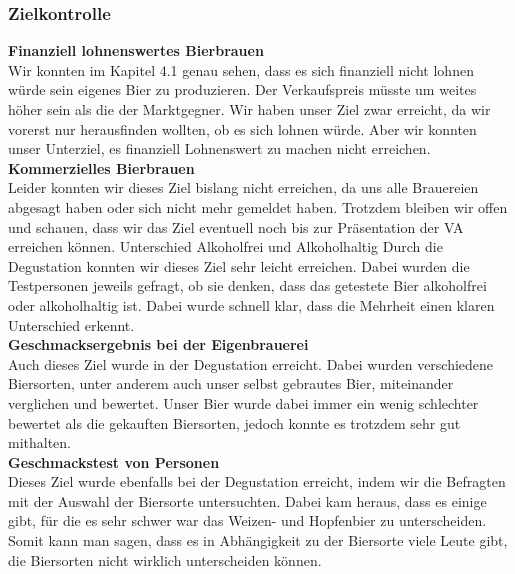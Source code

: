 \subsubsection{Zielkontrolle}
\textbf{Finanziell lohnenswertes Bierbrauen}\\
Wir konnten im Kapitel 4.1 genau sehen, dass es sich finanziell nicht lohnen würde sein eigenes Bier zu produzieren. Der Verkaufspreis müsste um weites höher sein als die der Marktgegner. Wir haben unser Ziel zwar erreicht, da wir vorerst nur herausfinden wollten, ob es sich lohnen würde. Aber wir konnten unser Unterziel, es finanziell Lohnenswert zu machen nicht erreichen.
\\
\textbf{Kommerzielles Bierbrauen}\\
Leider konnten wir dieses Ziel bislang nicht erreichen, da uns alle Brauereien abgesagt haben oder sich nicht mehr gemeldet haben. Trotzdem bleiben wir offen und schauen, dass wir das Ziel eventuell noch bis zur Präsentation der VA erreichen können.
Unterschied Alkoholfrei und Alkoholhaltig
Durch die Degustation konnten wir dieses Ziel sehr leicht erreichen. Dabei wurden die Testpersonen jeweils gefragt, ob sie denken, dass das getestete Bier alkoholfrei oder alkoholhaltig ist. Dabei wurde schnell klar, dass die Mehrheit einen klaren Unterschied erkennt.
\\\newpage
\textbf{Geschmacksergebnis bei der Eigenbrauerei}\\
Auch dieses Ziel wurde in der Degustation erreicht. Dabei wurden verschiedene Biersorten, unter anderem auch unser selbst gebrautes Bier, miteinander verglichen und bewertet. Unser Bier wurde dabei immer ein wenig schlechter bewertet als die gekauften Biersorten, jedoch konnte es trotzdem sehr gut mithalten.
\\
\textbf{Geschmackstest von Personen}\\
Dieses Ziel wurde ebenfalls bei der Degustation erreicht, indem wir die Befragten mit der Auswahl der Biersorte untersuchten. Dabei kam heraus, dass es einige gibt, für die es sehr schwer war das Weizen- und Hopfenbier zu unterscheiden. Somit kann man sagen, dass es in Abhängigkeit zu der Biersorte viele Leute gibt, die Biersorten nicht wirklich unterscheiden können.
\\

